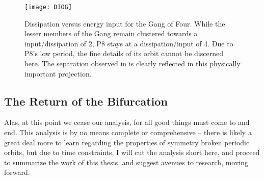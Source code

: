 \begin{figure}[h]
\texttt{[image: DIOG]}
\caption{Dissipation versus energy input for the Gang of Four. While the lesser members of the Gang remain clustered towards a input/dissipation of 2, P8 stays at a dissipation/input of 4. Due to P8's low period, the fine details of its orbit cannot be discerned here. The separation observed in  is clearly reflected in this physically important projection.}\label{fig:DIGOF}
\end{figure}

\subsection{The Return of the Bifurcation}



Alas, at this point we cease our analysis, for all good things must come to and end. This analysis is by no means complete or comprehensive -- there is likely a great deal more to learn regarding the properties of symmetry broken periodic orbits, but due to time constraints, I will cut the analysis short here, and proceed to summarize the work of this thesis, and suggest avenues to research, moving forward. 
